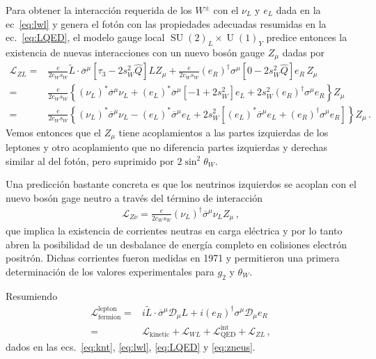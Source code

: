 Para obtener la interacción requerida de los $W^{\pm}$ con el $\nu_L$ y $e_L$ dada en la ec~\eqref{eq:lwl} y genera el fotón con las propiedades adecuadas resumidas en la ec.~\eqref{eq:LQED}, el modelo gauge local $\operatorname{SU}(2)_L\times \operatorname{U}(1)_Y$ predice entonces la existencia de nuevas interacciones con un nuevo bosón gauge $Z_{\mu}$ dadas por
\begin{align}
  \label{eq:zneus}
\mathcal{L}_{ZL}
=&\frac{e}{2c_W s_W} \widetilde{L}\cdot\overline{\sigma}^\mu\left[ \tau_3-2s_W^2\widehat{Q}\right]L Z_\mu
+\frac{e}{2c_W s_W} \left( e_R \right)^{\dagger}{\sigma}^\mu\left[ 0-2s_W^2\widehat{Q}\right]e_R\, Z_\mu \nonumber\\
  =&\frac{e}{2c_W s_W} \left\{ \left( \nu_L \right)^{*}\overline{\sigma}^\mu \nu_L
    + \left( e_L \right)^{*}\overline{\sigma}^\mu\left[ -1+2s_W^2\right]e_L
     +2s_W^2 \left( e_R \right)^{\dagger}{\sigma}^\mu e_R 
     \right\}Z_\mu \nonumber\\
 =&\frac{e}{2c_W s_W} \left\{ \left( \nu_L \right)^{*}\overline{\sigma}^\mu \nu_L
    - \left( e_L \right)^{*}\overline{\sigma}^\mu e_L 
    +2s_W^2 \left[\left( e_L \right)^{*}\overline{\sigma}^\mu e_L+
    \left( e_R \right)^{\dagger}{\sigma}^\mu e_R    \right]  
     \right\}Z_\mu\,.     
\end{align}
Vemos entonces que el $Z_{\mu}$ tiene acoplamientos a las partes izquierdas
de los leptones y otro acoplamiento que no diferencia partes izquierdas y derechas similar al del fotón, pero
suprimido por $2\sin^2\theta_W$.


Una predicción bastante concreta es que los neutrinos izquierdos se acoplan con el nuevo bosón gage neutro a través del término de interacción
\begin{align}
\mathcal{L}_{Z\nu}=  \frac{e}{2c_W s_W}\left( \nu_L \right)^{\dagger} \overline{\sigma}^{\mu} \nu_L Z_\mu\,,
\end{align}
que implica la existencia de corrientes neutras en carga eléctrica y por lo tanto abren la posibilidad de un desbalance de energía completo en colisiones electrón positrón. Dichas corrientes fueron medidas en 1971 y permitieron una primera determinación de los valores experimentales para $g_2$ y $\theta_W$.


Resumiendo
\begin{align}
  \label{eq:fermlep}
  \mathcal{L}_{\text{fermion}}^{\text{lepton}}=& i \widetilde{L}\cdot\overline{\sigma}^\mu\mathcal{D}_\mu L+  i \left( e_R \right)^{\dagger}{\sigma}^\mu\mathcal{D}_\mu e_R \nonumber\\
 =&\mathcal{L}_{\text{kinetic}}+
\mathcal{L}_{WL}+\mathcal{L}^{\text{int}}_{\text{QED}}+ \mathcal{L}_{ZL}\,,
\end{align}
dados en las ecs.~\eqref{eq:knt}, \eqref{eq:lwl}, \eqref{eq:LQED} y \eqref{eq:zneus}.



